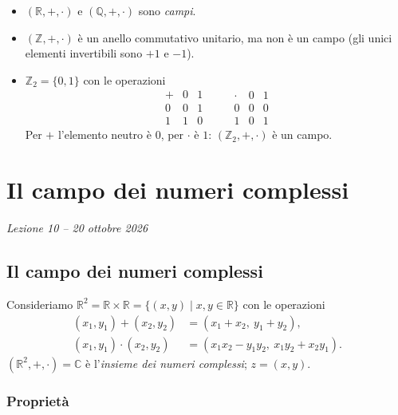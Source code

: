 \documentclass[11pt,a4paper]{article}
\begin{document}
\begin{esempio}
\begin{itemize}
  \item $(\mathbb{R}, +, \cdot)$ e $(\mathbb{Q}, +, \cdot)$ sono \emph{campi}.
  \item $(\mathbb{Z}, +, \cdot)$ è un anello commutativo unitario, ma non è un campo (gli unici elementi invertibili sono $+1$ e $-1$).
  \item $\mathbb{Z}_2 = \{0, 1\}$ con le operazioni
  \[
  \begin{array}{c|cc}
    + & 0 & 1 \\ \hline
    0 & 0 & 1 \\
    1 & 1 & 0
  \end{array}
  \qquad
  \begin{array}{c|cc}
    \cdot & 0 & 1 \\ \hline
    0 & 0 & 0 \\
    1 & 0 & 1
  \end{array}
  \]
  Per $+$ l'elemento neutro è $0$, per $\cdot$ è $1$: $(\mathbb{Z}_2, +, \cdot)$ è un campo.
\end{itemize}
\end{esempio}

\section[Il campo dei numeri complessi (Lezione 10 -- 20 ottobre 2026)]{Il campo dei numeri complessi}
\noindent\emph{Lezione 10 -- 20 ottobre 2026}
\subsection{Il campo dei numeri complessi}

Consideriamo $\mathbb{R}^2 = \mathbb{R}\times\mathbb{R} = \{(x, y) \mid x, y \in \mathbb{R}\}$ con le operazioni
\begin{align*}
  (x_1, y_1) + (x_2, y_2) &= (x_1 + x_2,\ y_1 + y_2),\\
  (x_1, y_1)\cdot(x_2, y_2) &= (x_1 x_2 - y_1 y_2,\ x_1 y_2 + x_2 y_1).
\end{align*}
$(\mathbb{R}^2, +, \cdot) = \mathbb{C}$ è l'\emph{insieme dei numeri complessi}; $z = (x, y)$.

\subsubsection{Proprietà}
\end{document}
